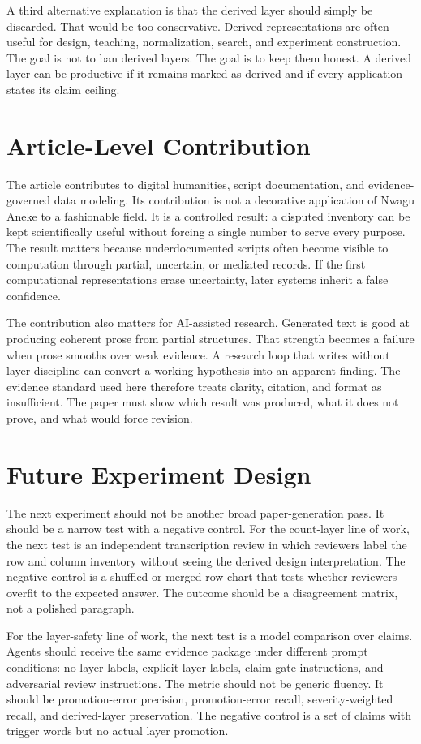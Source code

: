 \documentclass[sigconf,nonacm]{acmart}
\begin{document}
A third alternative explanation is that the derived layer should simply be
discarded. That would be too conservative. Derived representations are often
useful for design, teaching, normalization, search, and experiment construction.
The goal is not to ban derived layers. The goal is to keep them honest. A
derived layer can be productive if it remains marked as derived and if every
application states its claim ceiling.

\section{Article-Level Contribution}
The article contributes to digital humanities, script documentation, and evidence-governed data modeling. Its contribution is not a decorative
application of Nwagu Aneke to a fashionable field. It is a controlled result:
a disputed inventory can be kept scientifically useful without forcing a single number to serve every purpose. The result matters because underdocumented scripts often become
visible to computation through partial, uncertain, or mediated records. If the
first computational representations erase uncertainty, later systems inherit a
false confidence.

The contribution also matters for AI-assisted research. Generated text is good
at producing coherent prose from partial structures. That strength becomes a
failure when prose smooths over weak evidence. A research loop that writes
without layer discipline can convert a working hypothesis into an apparent
finding. The evidence standard used here therefore treats clarity, citation, and
format as insufficient. The paper must show which result was produced, what it
does not prove, and what would force revision.

\section{Future Experiment Design}
The next experiment should not be another broad paper-generation pass. It should
be a narrow test with a negative control. For the count-layer line of work, the
next test is an independent transcription review in which reviewers label the
row and column inventory without seeing the derived design interpretation. The
negative control is a shuffled or merged-row chart that tests whether reviewers
overfit to the expected answer. The outcome should be a disagreement matrix,
not a polished paragraph.

For the layer-safety line of work, the next test is a model comparison over
claims. Agents should receive the same evidence package under different prompt
conditions: no layer labels, explicit layer labels, claim-gate instructions, and
adversarial review instructions. The metric should not be generic fluency. It
should be promotion-error precision, promotion-error recall, severity-weighted
recall, and derived-layer preservation. The negative control is a set of claims
with trigger words but no actual layer promotion.
\end{document}
